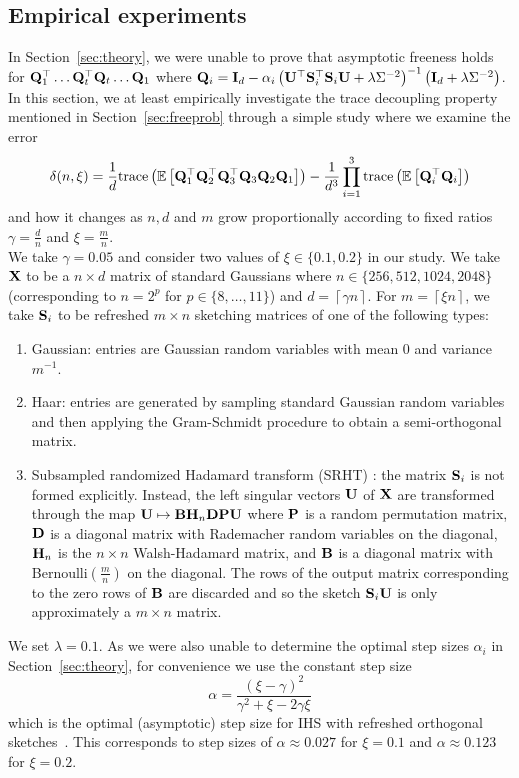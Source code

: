 \subsection{Empirical experiments} \label{sec:empirical}

In Section~\ref{sec:theory}, we were unable to prove that asymptotic freeness holds for $\mathbf{Q}_1^\top\ldots\mathbf{Q}_t^\top\mathbf{Q}_t\ldots\mathbf{Q}_1$ where $\mathbf{Q}_i=\mathbf{I}_d - \alpha_i\left(\mathbf{U}^\top\mathbf{S}_i^\top\mathbf{S}_i\mathbf{U} + \lambda\Sigma^{-2}\right)^{-1}\left(\mathbf{I}_d + \lambda\Sigma^{-2}\right)$. In this section, we at least empirically investigate the trace decoupling property mentioned in Section~\ref{sec:freeprob} through a simple study where we examine the error
\[
\delta(n,\xi) = \frac{1}{d}\mathrm{trace}\left(\mathbb{E}\left[\mathbf{Q}_1^\top\mathbf{Q}_2^\top\mathbf{Q}_3^\top\mathbf{Q}_3\mathbf{Q}_2\mathbf{Q}_1\right]\right) - \frac{1}{d^3}\prod_{i=1}^3\mathrm{trace}\left(\mathbb{E}\left[\mathbf{Q}_i^\top\mathbf{Q}_i\right]\right)
\]
and how it changes as $n,d$ and $m$ grow proportionally according to fixed ratios $\gamma=\frac{d}{n}$ and $\xi=\frac{m}{n}$.
\\

We take $\gamma=0.05$ and consider two values of $\xi\in\{0.1,0.2\}$ in our study. We take $\mathbf{X}$ to be a $n\times d$ matrix of \iid standard Gaussians where $n\in\{256,512,1024,2048\}$ (corresponding to $n=2^p$ for $p\in\{8,\ldots,11\}$) and $d=\left\lceil{\gamma n}\right\rceil$. For $m=\left\lceil{\xi n}\right\rceil$, we take $\mathbf{S}_i$ to be refreshed $m\times n$ sketching matrices of one of the following types:
\begin{enumerate}
\item
\iid Gaussian: entries are \iid Gaussian random variables with mean 0 and variance $m^{-1}$.
\item
Haar: entries are generated by sampling \iid standard Gaussian random variables and then applying the Gram-Schmidt procedure to obtain a semi-orthogonal matrix.
\item
Subsampled randomized Hadamard transform (SRHT) \citep{Lacotte:2020}: the matrix $\mathbf{S}_i$ is not formed explicitly. Instead, the left singular vectors $\mathbf{U}$ of $\mathbf{X}$ are transformed through the map $\mathbf{U}\mapsto \mathbf{B}\mathbf{H}_n\mathbf{D}\mathbf{P}\mathbf{U}$ where $\mathbf{P}$ is a random permutation matrix, $\mathbf{D}$ is a diagonal matrix with Rademacher random variables on the diagonal, $\mathbf{H}_n$ is the $n\times n$ Walsh-Hadamard matrix, and $\mathbf{B}$ is a diagonal matrix with Bernoulli$\left(\frac{m}{n}\right)$ on the diagonal. The rows of the output matrix corresponding to the zero rows of $\mathbf{B}$ are discarded and so the sketch $\mathbf{S}_i\mathbf{U}$ is only approximately a $m\times n$ matrix.
\end{enumerate}
We set $\lambda=0.1$. As we were also unable to determine the optimal step sizes $\alpha_i$ in Section~\ref{sec:theory}, for convenience we use the constant step size
\[
\alpha= \frac{(\xi-\gamma)^2}{\gamma^2+\xi-2\gamma\xi}
\]
which is the optimal (asymptotic) step size for IHS with refreshed orthogonal sketches~\citep{Lacotte:2020}. This corresponds to step sizes of $\alpha\approx0.027$ for $\xi=0.1$ and $\alpha\approx0.123$ for $\xi=0.2$.
\\

